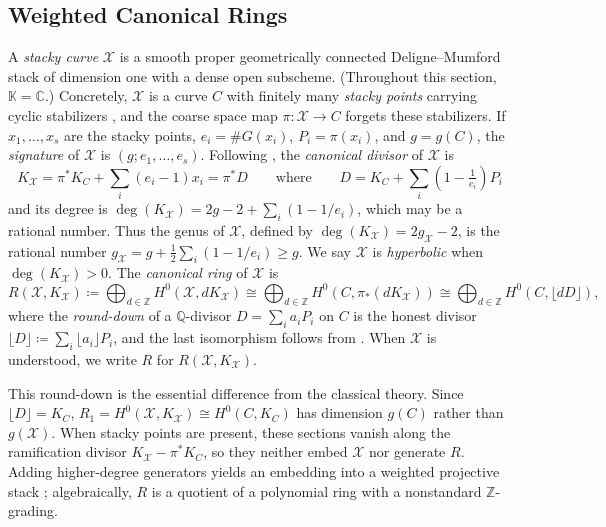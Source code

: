 \documentclass[11pt,reqno]{amsart}
\theoremstyle{remark}
\newcommand{\CC}{\mathbb{C}}
\newcommand{\KK}{\mathbb{K}}
\newcommand{\QQ}{\mathbb{Q}}
\newcommand{\ZZ}{\mathbb{Z}}
\newcommand{\cX}{\mathcal{X}}
\begin{document}
\subsection{Weighted Canonical Rings}\label{subsec:weighted-canonical}
A \emph{stacky curve} $\cX$ is a smooth proper geometrically connected Deligne--Mumford stack of dimension one with a dense open subscheme. (Throughout this section, $\KK=\CC$.) Concretely, $\cX$ is a curve $C$ with finitely many \emph{stacky points} carrying cyclic stabilizers \cite[Lem.~5.3.10]{voightZurieckBrown22}, and the coarse space map $\pi\colon \cX \to C$ forgets these stabilizers. If $x_1,\ldots,x_s$ are the stacky points, $e_i = \#G(x_i)$, $P_i = \pi(x_i)$, and $g = g(C)$, the \emph{signature} of $\cX$ is $(g;e_1,\ldots,e_s)$. Following \cite{voightZurieckBrown22}, the \emph{canonical divisor} of $\cX$ is
\begin{equation}\label{eq:floor}
	K_{\cX}=\pi^*K_C+\sum_{i}\left(e_i-1\right) x_i = \pi^*D \qquad \text{where} \qquad D=K_{C}+\sum_{i}\left(1-\tfrac{1}{e_i}\right)P_i
\end{equation}
and its degree is $\deg(K_{\cX}) = 2g-2+\sum_i(1-1/e_i)$, which may be a rational number. Thus the genus of $\cX$, defined by $\deg(K_{\cX}) = 2g_{\cX}-2$, is the rational number $g_{\cX} = g+\tfrac{1}{2}\sum_i(1-1/e_i)\geq g$. We say $\cX$ is \emph{hyperbolic} when $\deg(K_{\cX})>0$. The \emph{canonical ring} of $\cX$ is
\[
R\left(\cX,K_{\cX}\right) \coloneqq \bigoplus_{d\in \ZZ} H^0\left(\cX, dK_{\cX}\right) \cong \bigoplus_{d\in \ZZ} H^0\left(C, \pi_*(dK_{\cX})\right)  \cong \bigoplus_{d\in \ZZ} H^0\left(C, \lfloor dD \rfloor\right),
\]
where the \emph{round-down} of a $\QQ$-divisor $D=\sum_i a_iP_i$ on $C$ is the honest divisor $\lfloor D\rfloor \coloneqq \sum_i \lfloor a_i\rfloor P_i$, and the last isomorphism follows from \cite[\S~5.4]{voightZurieckBrown22}. When $\cX$ is understood, we write $R$ for $R(\cX, K_{\cX})$.

This round-down is the essential difference from the classical theory. Since $\lfloor D\rfloor=K_C$, $R_1=H^0(\cX,K_{\cX})\cong H^0(C,K_C)$ has dimension $g(C)$ rather than $g(\cX)$. When stacky points are present, these sections vanish along the ramification divisor $K_{\cX}-\pi^*K_C$, so they neither embed $\cX$ nor generate $R$. Adding higher-degree generators yields an embedding into a weighted projective stack \cite{braggOlssonWebb24}; algebraically, $R$ is a quotient of a polynomial ring with a nonstandard $\ZZ$-grading.
\end{document}
